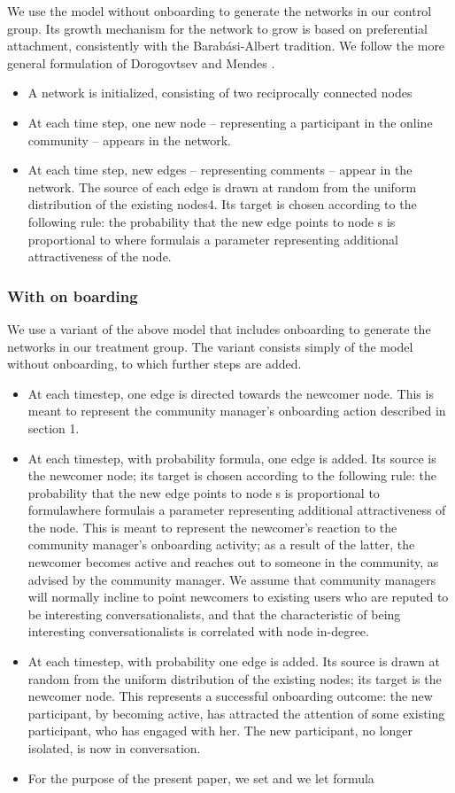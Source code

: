 We use the model without onboarding to generate the networks in our control group. Its growth mechanism for the network to grow is based on preferential attachment, consistently with the Barabási-Albert tradition. We follow the more general formulation of Dorogovtsev and Mendes \cite{dorogovtsev2002evolution}.
\begin{itemize}
\item A network is initialized, consisting of two reciprocally connected nodes
\item At each time step, one new node – representing a participant in the online community – appears in the network. 
\item At each time step,  new edges – representing comments – appear in the network. The source of each edge is drawn at random from the uniform distribution of the existing nodes4. Its target is chosen according to the following rule: the probability that the new edge points to node s is proportional to where formulais a parameter representing additional attractiveness of the node.
\end{itemize}

\subsubsection*{With on boarding}

We use a variant of the above model that includes onboarding to generate the networks in our treatment group. The variant consists simply of the model without onboarding, to which further steps are added.
\begin{itemize}
\item At each timestep, one edge is directed towards the newcomer node. This is meant to represent the community manager's onboarding action described in section 1. 
\item At each timestep, with probability formula, one edge is added. Its source is the newcomer node; its target is chosen according to the following rule: the probability that the new edge points to node s is proportional to formulawhere formulais a parameter representing additional attractiveness of the node. This is meant to represent the newcomer's reaction to the community manager's onboarding activity; as a result of the latter, the newcomer becomes active and reaches out to someone in the community, as advised by the community manager. We assume that community managers will normally incline to point newcomers to existing users who are reputed to be interesting conversationalists, and that the characteristic of being interesting conversationalists is correlated with node in-degree. 
\item At each timestep, with probability one edge is added. Its source is drawn at random from the uniform distribution of the existing nodes; its target is the newcomer node. This represents a successful onboarding outcome: the new participant, by becoming active, has attracted the attention of some existing participant, who has engaged with her. The new participant, no longer isolated, is now in conversation.
\item For the purpose of the present paper, we set and we let formula
\end{itemize}
